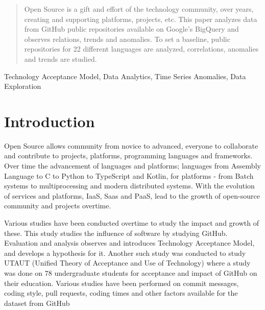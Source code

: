 \documentclass[12pt,conference]{IEEEtran}
\begin{document}
\begin{abstract}
Open Source is a gift and effort of the technology community, over years, creating and supporting platforms, projects, etc. This paper analyzes data from GitHub public repositories available on Google's BigQuery and observes relations, trends and anomalies. To set a baseline, public repositories for 22 different languages are analyzed, correlations, anomalies and trends are studied.  
\end{abstract}

\begin{IEEEkeywords}
  Technology Acceptance Model, Data Analytics, Time Series Anomalies, Data Exploration
\end{IEEEkeywords}






%



\section{Introduction}
Open Source allows community from novice to advanced, everyone to collaborate and contribute to projects, platforms, programming languages and frameworks. Over time the advancement of languages and platforms; languages from Assembly Language to C to Python to TypeScript and Kotlin, for platforms - from Batch systems to multiprocessing and modern distributed systems. With the evolution of services and platforms, IaaS, Saas and PaaS, lead to the growth of open-source community and projects overtime. 

Various studies have been conducted overtime to study the impact and growth of these. This study \cite{ghinflu} studies the influence of software by studying GitHub. Evaluation \cite{tam1} and \cite{tamis} analysis observes and introduces Technology Acceptance Model, and develops a hypothesis for it. Another such study \cite{taagh} was conducted to study UTAUT (Unified Theory of Acceptance and Use of Technology)\cite{taagh} where a study was done on 78 undergraduate students for acceptance and impact of GitHub on their education. Various studies \cite{dcagh} \cite{nandi2016anomaly} have been performed on commit messages, coding style, pull requests, coding times and other factors available for the dataset from GitHub \cite{ght}
\end{document}
